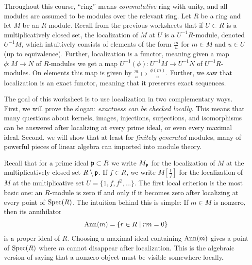 \documentclass[Notebook.tex]{subfiles}
\begin{document}
\ifSubfilesClassLoaded{}{}

\hrulefill

Throughout this course, ``ring'' means \textit{commutative} ring with unity, and all modules are assumed to be modules over the relevant ring. Let $R$ be a ring and let $M$ be an $R$-module. Recall from the previous worksheets that if $U \subset R$ is a multiplicatively closed set, the localization of $M$ at $U$ is a $U^{-1}R$-module, denoted $U^{-1}M$, which intuitively consists of elements of the form $\frac{m}{u}$ for $m\in M$ and $u\in U$ (up to equivalence). Further, localization is a functor, meaning given a map $\phi:M \to N$ of  $R$-modules we get a map $U^{-1}(\phi):U^{-1}M \to U^{-1}N$ of $U^{-1}R$-modules. On elements this map is given by $\frac{m}{u}\mapsto \frac{\phi(m)}{u}$. Further, we saw that localization is an exact functor, meaning that it preserves exact sequences. 

The goal of this worksheet is to use localization in two complementary ways. First, we will prove the slogan: \emph{exactness can be checked locally}. This means that many questions about kernels, images, injections, surjections, and isomorphisms can be answered after localizing at every prime ideal, or even every maximal ideal. Second, we will show that at least for \emph{finitely generated} modules, many of powerful pieces of  linear algebra can imported into module theory. 

Recall that for a prime ideal $\operatorname{\mathfrak{p}}\subset R$ we write $M_{\operatorname{\mathfrak{p}}}$ for the localization of $M$ at the multiplicatively closed set $R\setminus \operatorname{\mathfrak{p}}$. If $f\in R$, we write $M[\frac{1}{f}]$ for the localization of $M$ at the multiplicative set $U=\{1,f,f^2,\ldots\}$. The first local criterion is the most basic one: an $R$-module is zero if and only if it becomes zero after localizing at every point of $\operatorname{Spec}(R)$. The intuition behind this is simple: If $m\in M$ is nonzero, then its annihilator 
\[
\operatorname{\text{Ann}}(m)=\{r\in R\mid rm=0\}
\]
is a proper ideal of $R$. Choosing a maximal ideal containing $\operatorname{\text{Ann}}(m)$ gives a point of $\operatorname{Spec}(R)$ where $m$ cannot disappear after localization. This is the algebraic version of saying that a nonzero object must be visible somewhere locally.

\hrulefill

\newpage
\end{document}
